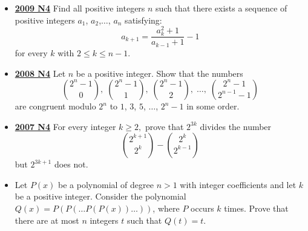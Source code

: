 \documentclass[11pt]{scrartcl}
\begin{document}
\begin{itemize}[leftmargin=*]
\item \href{https://artofproblemsolving.com/community/c6h355798p1932944}{\textbf{2009 N4}} Find all positive integers $n$ such that there exists a sequence of positive integers $a_1$, $a_2$,$\dots$, $a_n$ satisfying:\[a_{k+1}=\frac{a_k^2+1}{a_{k-1}+1}-1\]for every $k$ with $2\leqslant k\leqslant n-1$.
\item \href{https://artofproblemsolving.com/community/c6h287872p1555932}{\textbf{2008 N4}} 	Let $ n$ be a positive integer. Show that the numbers
\[ \binom{2^n - 1}{0},\; \binom{2^n - 1}{1},\; \binom{2^n - 1}{2},\; \dots,\; \binom{2^n - 1}{2^{n - 1} - 1}\]
are congruent modulo $ 2^n$ to $ 1$, $ 3$, $ 5$, $ \dots$, $ 2^n - 1$ in some order.
\item \href{https://artofproblemsolving.com/community/c6h214716p1187214}{\textbf{2007 N4}} For every integer $ k \geqslant  2,$ prove that $ 2^{3k}$ divides the number
\[ \binom{2^{k + 1}}{2^{k}} - \binom{2^{k}}{2^{k - 1}}
\]
but $ 2^{3k + 1}$ does not.
\item {} Let $P(x)$ be a polynomial of degree $n > 1$ with integer coefficients and let $k$ be a positive integer. Consider the polynomial $Q(x) = P(P(\dots P(P(x)) \dots ))$, where $P$ occurs $k$ times. Prove that there are at most $n$ integers $t$ such that $Q(t) = t$.
\end{itemize}
\newpage

\newpage
\end{document}
